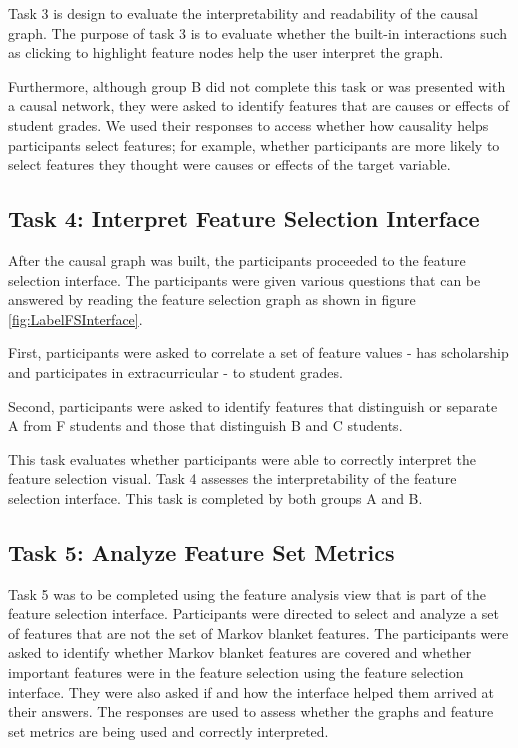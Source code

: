 Task 3 is design to evaluate the interpretability and readability of the causal graph.  The purpose of task 3 is to evaluate whether the built-in interactions such as clicking to highlight feature nodes help the user interpret the graph.

Furthermore, although group B did not complete this task or was presented with a causal network, they were asked to identify features that are causes or effects of student grades. We used their responses to access whether how causality helps participants select features; for example, whether participants are more likely to select features they thought were causes or effects of the target variable. 

\subsection { Task 4: Interpret Feature Selection Interface }
After the causal graph was built, the participants proceeded to the feature selection interface. The participants were given various questions that can be answered by reading the feature selection graph as shown in figure \ref{fig:LabelFSInterface}.

First, participants were asked to correlate a set of feature values - has scholarship and participates in extracurricular - to student grades.

Second, participants were asked to identify features that distinguish or separate A from F students and those that distinguish B and C students.

This task evaluates whether participants were able to correctly interpret the feature selection visual. Task 4 assesses the interpretability of the feature selection interface. This task is completed by both groups A and B. 

\subsection { Task 5: Analyze Feature Set Metrics }
Task 5 was to be completed using the feature analysis view that is part of the feature selection interface. Participants were directed to select and analyze a set of features that are not the set of Markov blanket features. The participants were asked to identify whether Markov blanket features are covered and whether important features were in the feature selection using the feature selection interface. They were also asked if and how the interface helped them arrived at their answers. The responses are used to assess whether the graphs and feature set metrics are being used and correctly interpreted. 

